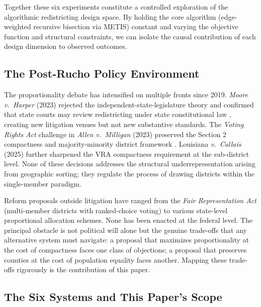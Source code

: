 Together these six experiments constitute a controlled exploration of the
algorithmic redistricting design space.  By holding the core algorithm
(edge-weighted recursive bisection via METIS) constant and varying the
objective function and structural constraints, we can isolate the causal
contribution of each design dimension to observed outcomes.

\subsection{The Post-Rucho Policy Environment}

The proportionality debate has intensified on multiple fronts since 2019.
\emph{Moore v.\ Harper} (2023) rejected the independent-state-legislature
theory and confirmed that state courts may review redistricting under state
constitutional law \citep{moore2023}, creating new litigation venues but not
new substantive standards.  The \emph{Voting Rights Act} challenge in
\emph{Allen v.\ Milligan} (2023) preserved the Section 2 compactness and
majority-minority district framework \citep{allen2023}.  Louisiana
\emph{v.\ Callais} (2025) further sharpened the VRA compactness requirement
at the sub-district level.  None of these decisions addresses the structural
underrepresentation arising from geographic sorting; they regulate the process
of drawing districts within the single-member paradigm.

Reform proposals outside litigation have ranged from the \emph{Fair
Representation Act} (multi-member districts with ranked-choice voting) to
various state-level proportional allocation schemes.  None has been enacted at
the federal level.  The principal obstacle is not political will alone but
the genuine trade-offs that any alternative system must navigate: a proposal
that maximizes proportionality at the cost of compactness faces one class of
objections; a proposal that preserves counties at the cost of population
equality faces another.  Mapping these trade-offs rigorously is the
contribution of this paper.

\subsection{The Six Systems and This Paper's Scope}

